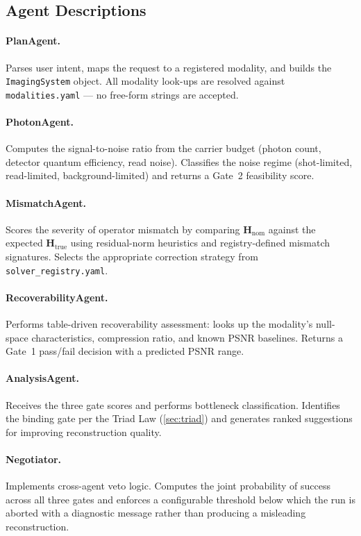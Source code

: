 \subsection{Agent Descriptions}

\paragraph{PlanAgent.}
Parses user intent, maps the request to a registered modality, and
builds the \texttt{ImagingSystem} object.  All modality look-ups are
resolved against \texttt{modalities.yaml} --- no free-form strings are
accepted.

\paragraph{PhotonAgent.}
Computes the signal-to-noise ratio from the carrier budget (photon
count, detector quantum efficiency, read noise).  Classifies the noise
regime (shot-limited, read-limited, background-limited) and returns a
Gate~2 feasibility score.

\paragraph{MismatchAgent.}
Scores the severity of operator mismatch by comparing
$\mathbf{H}_{\mathrm{nom}}$ against the expected
$\mathbf{H}_{\mathrm{true}}$ using residual-norm heuristics and
registry-defined mismatch signatures.  Selects the appropriate
correction strategy from \texttt{solver\_registry.yaml}.

\paragraph{RecoverabilityAgent.}
Performs table-driven recoverability assessment: looks up the modality's
null-space characteristics, compression ratio, and known PSNR baselines.
Returns a Gate~1 pass/fail decision with a predicted PSNR range.

\paragraph{AnalysisAgent.}
Receives the three gate scores and performs bottleneck classification.
Identifies the binding gate per the Triad Law (\cref{sec:triad}) and
generates ranked suggestions for improving reconstruction quality.

\paragraph{Negotiator.}
Implements cross-agent veto logic.  Computes the joint probability of
success across all three gates and enforces a configurable threshold
below which the run is aborted with a diagnostic message rather than
producing a misleading reconstruction.

